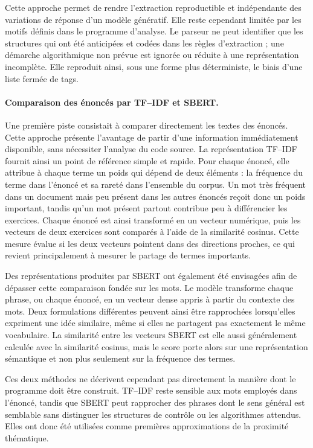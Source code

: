 \documentclass[12pt,a4paper,oneside]{report}
\begin{document}
Cette approche permet de rendre l'extraction reproductible et indépendante
des variations de réponse d'un modèle génératif. Elle reste cependant limitée
par les motifs définis dans le programme d'analyse. Le parseur ne peut
identifier que les structures qui ont été anticipées et codées dans les règles
d'extraction ; une démarche algorithmique non prévue est ignorée ou réduite à
une représentation incomplète. Elle reproduit ainsi, sous une forme plus
déterministe, le biais d'une liste fermée de tags.



\paragraph{Comparaison des énoncés par TF--IDF et SBERT.}

Une première piste consistait à comparer directement les textes des énoncés.
Cette approche présente l'avantage de partir d'une information immédiatement
disponible, sans nécessiter l'analyse du code source. La représentation TF--IDF
fournit ainsi un point de référence simple et rapide. Pour chaque énoncé, elle
attribue à chaque terme un poids qui dépend de deux éléments : la fréquence du
terme dans l'énoncé et sa rareté dans l'ensemble du corpus. Un mot très fréquent
dans un document mais peu présent dans les autres énoncés reçoit donc un poids
important, tandis qu'un mot présent partout contribue peu à différencier les
exercices. Chaque énoncé est ainsi transformé en un vecteur numérique, puis les
vecteurs de deux exercices sont comparés à l'aide de la similarité cosinus.
Cette mesure évalue si les deux vecteurs pointent dans des directions proches,
ce qui revient principalement à mesurer le partage de termes importants.

Des représentations produites par SBERT  ont également
été envisagées afin de dépasser cette comparaison fondée sur les mots. Le
modèle transforme chaque phrase, ou chaque énoncé, en un vecteur dense appris à
partir du contexte des mots. Deux formulations différentes peuvent ainsi être
rapprochées lorsqu'elles expriment une idée similaire, même si elles ne
partagent pas exactement le même vocabulaire. La similarité entre les vecteurs
SBERT est elle aussi généralement calculée avec la similarité cosinus, mais le
score porte alors sur une représentation sémantique et non plus seulement sur
la fréquence des termes.

Ces deux méthodes ne décrivent cependant pas directement la manière dont le
programme doit être construit. TF--IDF reste sensible aux mots employés dans
l'énoncé, tandis que SBERT peut rapprocher des phrases dont le sens général est
semblable sans distinguer les structures de contrôle ou les algorithmes
attendus. Elles ont donc été utilisées comme premières approximations de la
proximité thématique.
\end{document}
